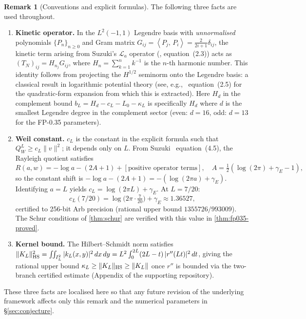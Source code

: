 \documentclass[12pt,a4paper]{amsart}
\theoremstyle{plain}
\theoremstyle{definition}
\newtheorem{remark}[theorem]{Remark}
\newcommand{\Lzero}{L_0}             %
\newcommand{\ip}[2]{\left\langle #1,\, #2\right\rangle}
\begin{document}
\begin{remark}[Conventions and explicit formulas]
\label{rem:conventions}
The following three facts are used throughout.
\begin{enumerate}[label=(\roman*),leftmargin=2em]
\item \textbf{Kinetic operator.}
  In the $L^2(-1,1)$ Legendre basis with \emph{unnormalised} polynomials
  $\{P_n\}_{n\ge0}$ and Gram matrix $G_{ij} = \ip{P_j}{P_i} = \tfrac{2}{2i+1}\delta_{ij}$,
  the kinetic term arising from Suzuki's $\mathcal{L}_a$ operator
  (\cite{Suzuki2026}, equation~(2.3)) acts as $(T_N)_{ij} = H_{n_j}G_{ij}$, where
  $H_n = \sum_{k=1}^n k^{-1}$ is the $n$-th harmonic number.
  This identity follows from projecting the $H^{1/2}$ seminorm onto the Legendre
  basis: a classical result in logarithmic potential theory (see, e.g.,~\cite{Suzuki2026}
  equation~(2.5) for the quadratic-form expansion from which this is extracted).
  Here $H_d$ in the complement bound $b_L = H_d - c_L - \Lzero - \kappa_L$
  is specifically $H_d$ where $d$ is the
  smallest Legendre degree in the complement sector
  (even: $d=16$, odd: $d=13$ for the FP-0.35 parameters).
\item \textbf{Weil constant.} $c_L$ is the constant in the explicit formula
  such that $Q_W^L \ge c_L \|v\|^2$; it depends only on $L$.
  From Suzuki~\cite{Suzuki2026} equation~(4.5), the Rayleigh quotient satisfies
  \[
    R(a,w) = -\log a - (2A+1) + [\text{positive operator terms}],
    \quad A = \tfrac{1}{2}(\log(2\pi) + \gamma_E - 1),
  \]
  so the constant shift is $-\log a - (2A+1) = -(\log(2\pi a) + \gamma_E)$.
  Identifying $a = L$ yields $c_L = \log(2\pi L) + \gamma_E$.
  At $L = 7/20$:
  \[
    c_L(7/20) = \log\!\bigl(2\pi\cdot\tfrac{7}{20}\bigr) + \gamma_E
    \approx 1.36527,
  \]
  certified to 256-bit Arb precision (rational upper bound $1355726/993009$).
  The Schur conditions of \cref{thm:schur} are verified with this value
  in \cref{thm:fp035-proved}.
\item \textbf{Kernel bound.} The Hilbert--Schmidt norm satisfies
  $\|K_L\|_{\rm HS}^2 = \iint_{I_L^2} |k_L(x,y)|^2\,dx\,dy
   = L^2 \int_0^{2L} (2L - t)\,|r''(Lt)|^2\,dt$,
  giving the rational upper bound $\kappa_L \ge \|K_L\|_{\rm HS} \ge \|K_L\|$
  once $r''$ is bounded via the two-branch certified estimate
  (Appendix of the supporting repository).
\end{enumerate}
These three facts are localised here so that any future revision
of the underlying framework affects only this remark and the numerical
parameters in \S\ref{sec:conjecture}.
\end{remark}
\end{document}
